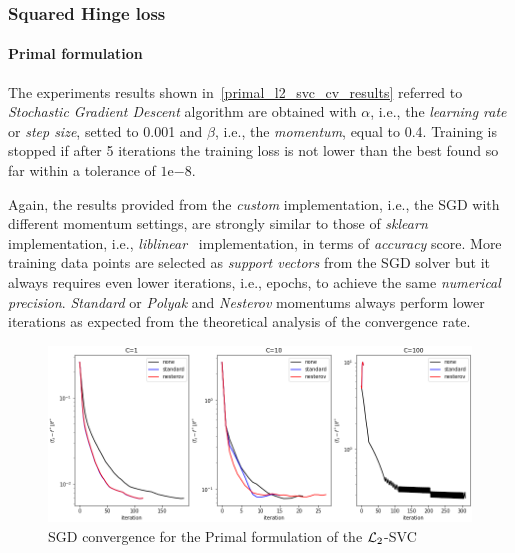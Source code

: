 \pagebreak

\subsubsection{Squared Hinge loss}

\paragraph{Primal formulation}

The experiments results shown in~\ref{primal_l2_svc_cv_results} referred to \emph{Stochastic Gradient Descent} algorithm are obtained with $\alpha$, i.e., the \emph{learning rate} or \emph{step size}, setted to 0.001 and $\beta$, i.e., the \emph{momentum}, equal to 0.4. Training is stopped if after 5 iterations the training loss is not lower than the best found so far within a tolerance of $1\mathrm{e}{-8}$.



Again, the results provided from the \emph{custom} implementation, i.e., the SGD with different momentum settings, are strongly similar to those of \emph{sklearn} implementation, i.e., \emph{liblinear}~\cite{fan2008liblinear} implementation, in terms of \emph{accuracy} score. More training data points are selected as \emph{support vectors} from the SGD solver but it always requires even lower iterations, i.e., epochs, to achieve the same \emph{numerical precision}. \emph{Standard} or \emph{Polyak} and \emph{Nesterov} momentums always perform lower iterations as expected from the theoretical analysis of the convergence rate.

\begin{figure}[H]
	\centering
	\includegraphics[scale=0.55]{img/l2_svc_loss_history}
	\caption{SGD convergence for the Primal formulation of the $\protect \mathcal{L}_2$-SVC}
	\label{fig:l2_svc_loss_history}
\end{figure}

